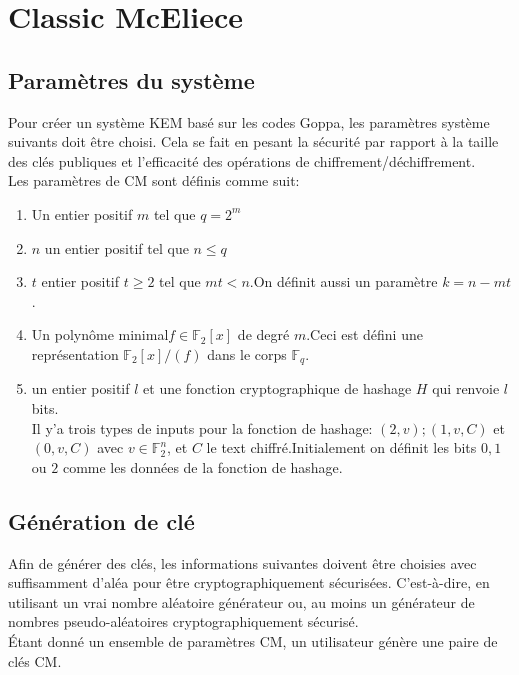 \documentclass[12pt,openany]{report}
\begin{document}
\section{Classic McEliece}
\subsection{Paramètres du système}
Pour créer un système KEM basé sur les codes Goppa, les paramètres système suivants
doit être choisi. Cela se fait en pesant la sécurité par rapport à la taille des clés publiques
et l'efficacité des opérations de chiffrement/déchiffrement.\\
 Les paramètres de CM sont définis comme suit:
\begin{enumerate}
\item Un entier positif $m$ tel que $q=2^m$
\item $n$ un entier positif tel que $n\leq q$
\item $t$ entier positif $t\geq 2$ tel que $mt<n$.On définit aussi un paramètre $k=n-mt$.
\item Un polynôme minimal$\mathit{f} \in \mathbb{F}_2[x]$ de degré $m$.Ceci est défini une représentation $ \mathbb{F}_2[x]/(\mathit{f})$ dans le corps $\mathbb{F}_q$.
\item un entier positif $\mathit{l}$ et une fonction cryptographique de hashage $\mathit{H}$ qui renvoie $\mathit{l}$ bits.\\
Il y'a trois types de inputs pour la fonction de hashage: $(2,\mathit{v});(1,\mathit{v},\mathit{C})$ et $(0,\mathit{v},\mathit{C})$ avec $\mathit{v} \in \mathbb{F}_2^n$, et $\mathit{C}$ le text chiffré.Initialement on définit les bits $0,1$ ou $2$ comme les données de la fonction de hashage.
\end{enumerate}
\subsection{Génération de clé}
Afin de générer des clés, les informations suivantes doivent être choisies avec suffisamment d'aléa pour être cryptographiquement sécurisées. C'est-à-dire, en utilisant un vrai nombre aléatoire
générateur ou, au moins un générateur de nombres pseudo-aléatoires cryptographiquement sécurisé.\\
Étant donné un ensemble de paramètres CM, un utilisateur génère une paire de clés CM.\\
\end{document}
